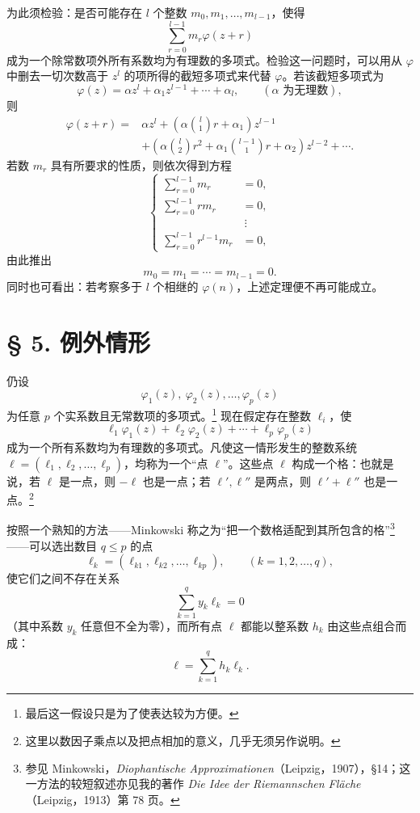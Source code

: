 \documentclass[UTF8,11pt,a4paper,fontset=none]{ctexart}
\theoremstyle{weylthm}
\begin{document}
为此须检验：是否可能存在 \(l\) 个整数
\(m_0,m_1,\ldots,m_{l-1}\)，使得
\[
  \sum_{r=0}^{l-1}m_r\varphi(z+r)
\]
成为一个除常数项外所有系数均为有理数的多项式。检验这一问题时，可以用从
\(\varphi\) 中删去一切次数高于 \(z^l\) 的项所得的截短多项式来代替
\(\varphi\)。若该截短多项式为
\[
  \varphi(z)=\alpha z^l+\alpha_1z^{l-1}+\cdots+\alpha_l,
  \qquad (\alpha\text{ 为无理数}),
\]
则
\[
\begin{aligned}
 \varphi(z+r)={}&\alpha z^l
 +\left(\alpha\binom l1r+\alpha_1\right)z^{l-1}\\
 &+\left(\alpha\binom l2r^2
   +\alpha_1\binom{l-1}{1}r+\alpha_2\right)z^{l-2}
 +\cdots.
\end{aligned}
\]
若数 \(m_r\) 具有所要求的性质，则依次得到方程
\[
\left\{
\begin{aligned}
 \sum_{r=0}^{l-1}m_r&=0,\\
 \sum_{r=0}^{l-1}r m_r&=0,\\
 &\ \vdots\\
 \sum_{r=0}^{l-1}r^{l-1}m_r&=0,
\end{aligned}
\right.
\]
由此推出
\[
  m_0=m_1=\cdots=m_{l-1}=0.
\]
同时也可看出：若考察多于 \(l\) 个相继的 \(\varphi(n)\)，上述定理便不再可能成立。

\section*{§ 5. 例外情形}

仍设
\[
  \varphi_1(z),\ \varphi_2(z),\ldots,\varphi_p(z)
\]
为任意 \(p\) 个实系数且无常数项的多项式。\footnote{最后这一假设只是为了使表达较为方便。} 现在假定存在整数
\(\ell_i\)，使
\[
  \ell_1\varphi_1(z)+\ell_2\varphi_2(z)+\cdots+\ell_p\varphi_p(z)
\]
成为一个所有系数均为有理数的多项式。凡使这一情形发生的整数系统
\(\boldsymbol\ell=(\ell_1,\ell_2,\ldots,\ell_p)\)，均称为一个“点
\(\boldsymbol\ell\)”。这些点 \(\boldsymbol\ell\) 构成一个格：也就是说，若
\(\boldsymbol\ell\) 是一点，则 \(-\boldsymbol\ell\) 也是一点；若
\(\boldsymbol\ell',\boldsymbol\ell''\) 是两点，则
\(\boldsymbol\ell'+\boldsymbol\ell''\) 也是一点。\footnote{这里以数因子乘点以及把点相加的意义，几乎无须另作说明。}

按照一个熟知的方法——Minkowski 称之为“把一个数格适配到其所包含的格”\footnote{参见 Minkowski，\emph{Diophantische Approximationen}（Leipzig，1907），§14；这一方法的较短叙述亦见我的著作 \emph{Die Idee der Riemannschen Fläche}（Leipzig，1913）第 78 页。}——可以选出数目
\(q\leq p\) 的点
\[
  \boldsymbol\ell_k=(\ell_{k1},\ell_{k2},\ldots,\ell_{kp}),
  \qquad (k=1,2,\ldots,q),
\]
使它们之间不存在关系
\[
  \sum_{k=1}^{q}y_k\boldsymbol\ell_k=0
\]
（其中系数 \(y_k\) 任意但不全为零），而所有点
\(\boldsymbol\ell\) 都能以整系数 \(h_k\) 由这些点组合而成：
\[
  \boldsymbol\ell=\sum_{k=1}^{q}h_k\boldsymbol\ell_k.
\]
\end{document}
